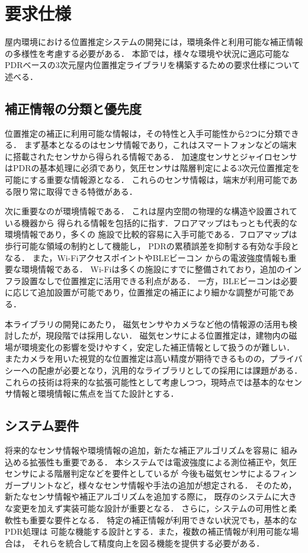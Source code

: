 

\section{要求仕様}

屋内環境における位置推定システムの開発には，環境条件と利用可能な補正情報の多様性を考慮する必要がある．
本節では，様々な環境や状況に適応可能なPDRベースの3次元屋内位置推定ライブラリを構築するための要求仕様について述べる．


\subsection{補正情報の分類と優先度}

位置推定の補正に利用可能な情報は，その特性と入手可能性から2つに分類できる．
まず基本となるのはセンサ情報であり，これはスマートフォンなどの端末に搭載されたセンサから得られる情報である．
加速度センサとジャイロセンサはPDRの基本処理に必須であり，気圧センサは階層判定による3次元位置推定を可能にする重要な情報源となる．
これらのセンサ情報は，端末が利用可能である限り常に取得できる特徴がある．

次に重要なのが環境情報である．
これは屋内空間の物理的な構造や設置されている機器から
得られる情報を包括的に指す．フロアマップはもっとも代表的な環境情報であり，多くの
施設で比較的容易に入手可能である．フロアマップは歩行可能な領域の制約として機能し，
PDRの累積誤差を抑制する有効な手段となる．
また，Wi-FiアクセスポイントやBLEビーコン
からの電波強度情報も重要な環境情報である．
Wi-Fiは多くの施設にすでに整備されており，追加のインフラ設置なしで位置推定に活用できる利点がある．
一方，BLEビーコンは必要に応じて追加設置が可能であり，位置推定の補正により細かな調整が可能である．

本ライブラリの開発にあたり，
磁気センサやカメラなど他の情報源の活用も検討したが，現段階では採用しない．
磁気センサによる位置推定は，建物内の磁場が環境変化の影響を受けやすく，安定した補正情報として扱うのが難しい．
またカメラを用いた視覚的な位置推定は高い精度が期待できるものの，プライバシーへの配慮が必要となり，汎用的なライブラリとしての採用には課題がある．
これらの技術は将来的な拡張可能性として考慮しつつ，現時点では基本的なセンサ情報と環境情報に焦点を当てた設計とする．

\subsection{システム要件}

将来的なセンサ情報や環境情報の追加，新たな補正アルゴリズムを容易に
組み込める拡張性も重要である．
本システムでは電波強度による測位補正や，気圧センサによる階層判定などを要件としているが
今後も磁気センサによるフィンガープリントなど，様々なセンサ情報や手法の追加が想定される．
そのため，新たなセンサ情報や補正アルゴリズムを追加する際に，
既存のシステムに大きな変更を加えず実装可能な設計が重要となる．
さらに，システムの可用性と柔軟性も重要な要件となる．
特定の補正情報が利用できない状況でも，基本的なPDR処理は
可能な機能する設計とする．また，複数の補正情報が利用可能な場合は，
それらを統合して精度向上を図る機能を提供する必要がある．



